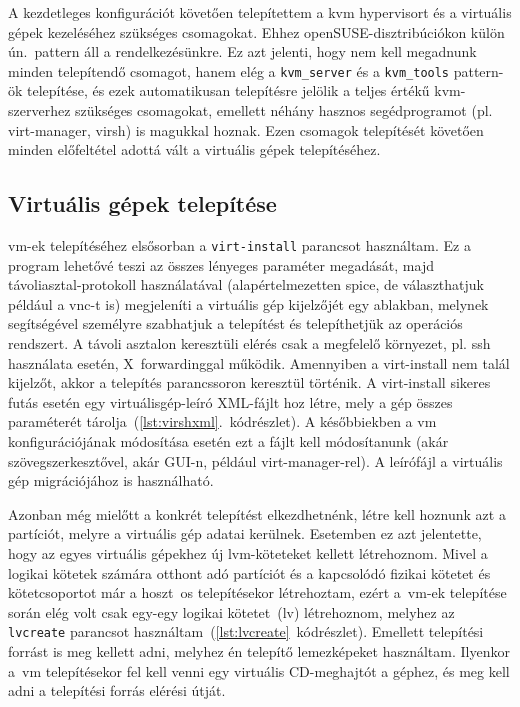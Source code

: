 A kezdetleges konfigurációt követően telepítettem a \acrshort{kvm} \gls{hypervisor}t és a virtuális gépek kezeléséhez szükséges csomagokat. Ehhez openSUSE-disztribúciókon külön ún.~pattern áll a rendelkezésünkre. Ez azt jelenti, hogy nem kell megadnunk minden telepítendő csomagot, hanem elég a \texttt{kvm\_server} és a \texttt{kvm\_tools} pattern-ök telepítése, és ezek automatikusan telepítésre jelölik a teljes értékű \acrshort{kvm}-szerverhez szükséges csomagokat, emellett néhány hasznos segédprogramot (pl. virt-manager, virsh) is magukkal hoznak. Ezen csomagok telepítését követően minden előfeltétel adottá vált a virtuális gépek telepítéséhez.


\subsection{Virtuális gépek telepítése}
\acrshort{vm}-ek telepítéséhez elsősorban a \texttt{virt-install} parancsot használtam. Ez a program lehetővé teszi az összes lényeges paraméter megadását, majd távoliasztal-protokoll használatával (alapértelmezetten \acrshort{spice}, de választhatjuk például a \acrshort{vnc}-t is) megjeleníti a virtuális gép kijelzőjét egy ablakban, melynek segítségével személyre szabhatjuk a telepítést és telepíthetjük az operációs rendszert. A távoli asztalon keresztüli elérés csak a megfelelő környezet, pl. \acrshort{ssh} használata esetén, X~forwardinggal működik. Amennyiben a virt-install nem talál kijelzőt, akkor a telepítés parancssoron keresztül történik. A virt-install sikeres futás esetén egy virtuálisgép-leíró XML-fájlt hoz létre, mely a gép összes paraméterét tárolja~(\ref{lst:virshxml}.~kódrészlet). A későbbiekben a \acrshort{vm} konfigurációjának módosítása esetén ezt a fájlt kell módosítanunk (akár szövegszerkesztővel, akár GUI-n, például virt-manager-rel). A leírófájl a virtuális gép migrációjához is használható.

Azonban még mielőtt a konkrét telepítést elkezdhetnénk, létre kell hoznunk azt a partíciót, melyre a virtuális gép adatai kerülnek. Esetemben ez azt jelentette, hogy az egyes virtuális gépekhez új \acrshort{lvm}-köteteket kellett létrehoznom. Mivel a logikai kötetek számára otthont adó partíciót és a kapcsolódó fizikai kötetet és kötetcsoportot már a hoszt~\acrshort{os} telepítésekor létrehoztam, ezért a~\acrshort{vm}-ek telepítése során elég volt csak egy-egy logikai kötetet~(\acrshort{lv}) létrehoznom, melyhez az \texttt{lvcreate} parancsot használtam~(\ref{lst:lvcreate}~kódrészlet).
Emellett telepítési forrást is meg kellett adni, melyhez én telepítő lemezképeket használtam. Ilyenkor a~\acrshort{vm} telepítésekor fel kell venni egy virtuális CD-meghajtót a géphez, és meg kell adni a telepítési forrás elérési útját.

